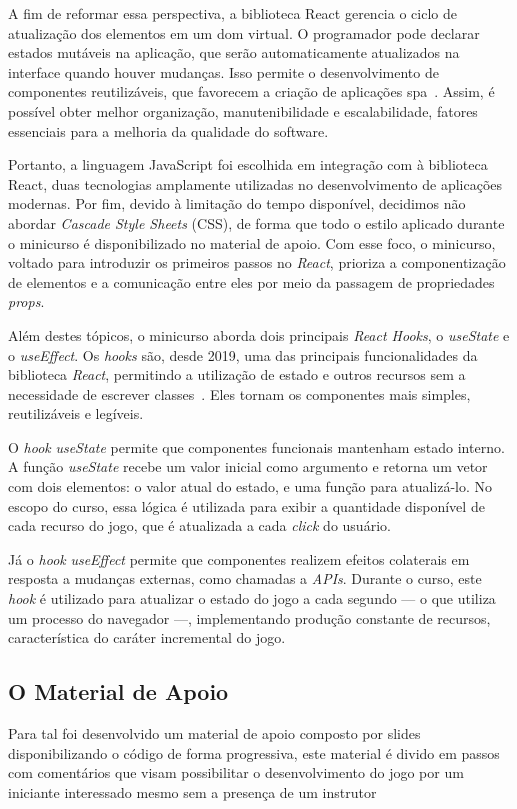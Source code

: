 A fim de reformar essa perspectiva, a biblioteca React gerencia o ciclo de atualização dos elementos em um \gls{dom} virtual.
O programador pode declarar estados mutáveis na aplicação, que serão automaticamente atualizados na interface quando houver mudanças.
Isso permite o desenvolvimento de componentes reutilizáveis, que favorecem a criação de aplicações \gls{spa}~\cite{meta:2025:thinking_in_react}.
Assim, é possível obter melhor organização, manutenibilidade e escalabilidade, fatores essenciais para a melhoria da qualidade do software.

Portanto, a linguagem JavaScript foi escolhida em integração com à biblioteca React, duas tecnologias amplamente utilizadas no desenvolvimento de aplicações modernas. Por fim, devido à limitação do tempo disponível, decidimos não abordar \textit{Cascade Style Sheets} (CSS), de forma que todo o estilo aplicado durante o minicurso é disponibilizado no material de apoio.
Com esse foco, o minicurso, voltado para introduzir os primeiros passos no \textit{React}, prioriza a componentização de elementos e a comunicação entre eles por meio da passagem de propriedades \textit{props}.

Além destes tópicos, o minicurso aborda dois principais \textit{React Hooks}, o \textit{useState} e o \textit{useEffect}.
Os \textit{hooks} são, desde 2019, uma das principais funcionalidades da biblioteca \textit{React}, permitindo a utilização de estado e outros recursos sem a necessidade de escrever classes~\cite{meta:2025:react_dom_hooks}. Eles tornam os componentes mais simples, reutilizáveis e legíveis.

O \textit{hook} \textit{useState} permite que componentes funcionais mantenham estado interno.
A função \textit{useState} recebe um valor inicial como argumento e retorna um vetor com dois elementos: o valor atual do estado, e uma função para atualizá-lo.
No escopo do curso, essa lógica é utilizada para exibir a quantidade disponível de cada recurso do jogo, que é atualizada a cada \textit{click} do usuário.

Já o \textit{hook} \textit{useEffect} permite que componentes realizem efeitos colaterais em resposta a mudanças externas, como chamadas a \textit{APIs}.
Durante o curso, este \textit{hook} é utilizado para atualizar o estado do jogo a cada segundo --- o que utiliza um processo do navegador ---, implementando produção constante de recursos, característica do caráter incremental do jogo.

\subsection{O Material de Apoio}
Para tal foi desenvolvido um material de apoio composto por slides disponibilizando o código de forma progressiva, este material é divido em passos com comentários que visam possibilitar o desenvolvimento do jogo por um iniciante interessado mesmo sem a presença de um instrutor 

